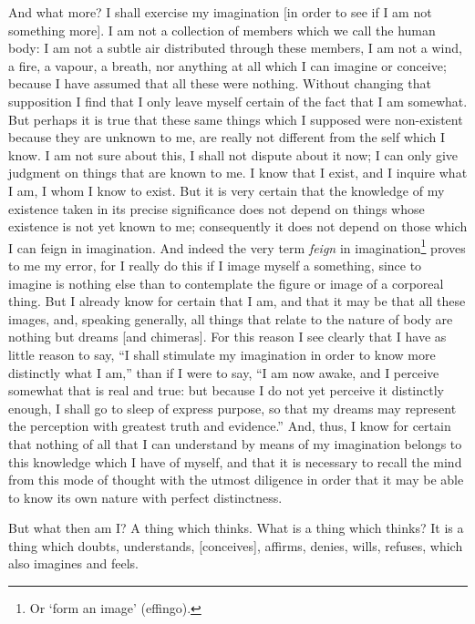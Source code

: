 And what more? I shall exercise my imagination [in order to see if I
am not something more]. I am not a collection of members which we call
the human body: I am not a subtle air distributed through these
members, I am not a wind, a fire, a vapour, a breath, nor anything at
all which I can imagine or conceive; because I have assumed that all
these were nothing. Without changing that supposition I find that I
only leave myself certain of the fact that I am somewhat. But perhaps
it is true that these same things which I supposed were non-existent
because they are unknown to me, are really not different from the self
which I know. I am not sure about this, I shall not dispute about it
now; I can only give judgment on things that are known to me. I know
that I exist, and I inquire what I am, I whom I know to exist. But it
is very certain that the knowledge of my existence taken in its
precise significance does not depend on things whose existence is not
yet known to me; consequently it does not depend on those which I can
feign in imagination. And indeed the very term \textit{feign} in
imagination\footnote{Or `form an image' (effingo).} proves to me my
error, for I really do this if I image myself a something, since to
imagine is nothing else than to contemplate the figure or image of a
corporeal thing. But I already know for certain that I am, and that it
may be that all these images, and, speaking generally, all things that
relate to the nature of body are nothing but dreams [and chimeras].
For this reason I see clearly that I have as little reason to say, ``I
shall stimulate my imagination in order to know more distinctly what I
am,'' than if I were to say, ``I am now awake, and I perceive somewhat
that is real and true: but because I do not yet perceive it distinctly
enough, I shall go to sleep of express purpose, so that my dreams may
represent the perception with greatest truth and evidence.'' And,
thus, I know for certain that nothing of all that I can understand by
means of my imagination belongs to this knowledge which I have of
myself, and that it is necessary to recall the mind from 
this mode of thought with the utmost diligence in order that it may be
able to know its own nature with perfect distinctness.

But what then am I? A thing which thinks. What is a thing which
thinks? It is a thing which doubts, understands, [conceives], affirms,
denies, wills, refuses, which also imagines and feels.

